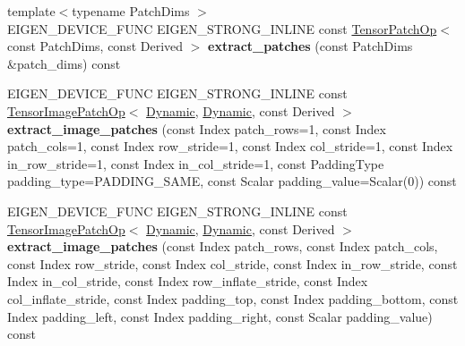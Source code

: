 \begin{DoxyCompactItemize}
\item 
\mbox{\label{class_eigen_1_1_tensor_base_3_01_derived_00_01_read_only_accessors_01_4_a472b30ac1116486272313e0124cf45f1}} 
{\footnotesize template$<$typename Patch\+Dims $>$ }\\E\+I\+G\+E\+N\+\_\+\+D\+E\+V\+I\+C\+E\+\_\+\+F\+U\+NC E\+I\+G\+E\+N\+\_\+\+S\+T\+R\+O\+N\+G\+\_\+\+I\+N\+L\+I\+NE const \hyperlink{class_eigen_1_1_tensor_patch_op}{Tensor\+Patch\+Op}$<$ const Patch\+Dims, const Derived $>$ {\bfseries extract\+\_\+patches} (const Patch\+Dims \&patch\+\_\+dims) const
\item 
\mbox{\label{class_eigen_1_1_tensor_base_3_01_derived_00_01_read_only_accessors_01_4_acdcf51aebcd38a7a66b44e8efb9886d1}} 
E\+I\+G\+E\+N\+\_\+\+D\+E\+V\+I\+C\+E\+\_\+\+F\+U\+NC E\+I\+G\+E\+N\+\_\+\+S\+T\+R\+O\+N\+G\+\_\+\+I\+N\+L\+I\+NE const \hyperlink{class_eigen_1_1_tensor_image_patch_op}{Tensor\+Image\+Patch\+Op}$<$ \hyperlink{namespace_eigen_ad81fa7195215a0ce30017dfac309f0b2}{Dynamic}, \hyperlink{namespace_eigen_ad81fa7195215a0ce30017dfac309f0b2}{Dynamic}, const Derived $>$ {\bfseries extract\+\_\+image\+\_\+patches} (const Index patch\+\_\+rows=1, const Index patch\+\_\+cols=1, const Index row\+\_\+stride=1, const Index col\+\_\+stride=1, const Index in\+\_\+row\+\_\+stride=1, const Index in\+\_\+col\+\_\+stride=1, const Padding\+Type padding\+\_\+type=P\+A\+D\+D\+I\+N\+G\+\_\+\+S\+A\+ME, const Scalar padding\+\_\+value=Scalar(0)) const
\item 
\mbox{\label{class_eigen_1_1_tensor_base_3_01_derived_00_01_read_only_accessors_01_4_a7d0b49fb78ffe05a2609def9be20fb6e}} 
E\+I\+G\+E\+N\+\_\+\+D\+E\+V\+I\+C\+E\+\_\+\+F\+U\+NC E\+I\+G\+E\+N\+\_\+\+S\+T\+R\+O\+N\+G\+\_\+\+I\+N\+L\+I\+NE const \hyperlink{class_eigen_1_1_tensor_image_patch_op}{Tensor\+Image\+Patch\+Op}$<$ \hyperlink{namespace_eigen_ad81fa7195215a0ce30017dfac309f0b2}{Dynamic}, \hyperlink{namespace_eigen_ad81fa7195215a0ce30017dfac309f0b2}{Dynamic}, const Derived $>$ {\bfseries extract\+\_\+image\+\_\+patches} (const Index patch\+\_\+rows, const Index patch\+\_\+cols, const Index row\+\_\+stride, const Index col\+\_\+stride, const Index in\+\_\+row\+\_\+stride, const Index in\+\_\+col\+\_\+stride, const Index row\+\_\+inflate\+\_\+stride, const Index col\+\_\+inflate\+\_\+stride, const Index padding\+\_\+top, const Index padding\+\_\+bottom, const Index padding\+\_\+left, const Index padding\+\_\+right, const Scalar padding\+\_\+value) const

\end{DoxyCompactItemize}
